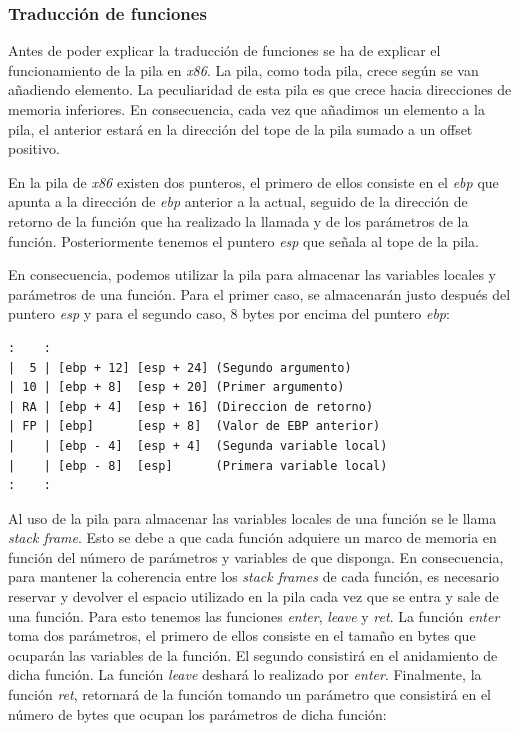 \documentclass[a4paper,10pt]{article}
\begin{document}
\subsubsection{Traducción de funciones}

Antes de poder explicar la traducción de funciones se ha de explicar el funcionamiento de la pila en \textit{x86}. La pila, como toda pila, crece según se van añadiendo elemento. La peculiaridad de esta pila es que crece hacia direcciones de memoria inferiores. En consecuencia, cada vez que añadimos un elemento a la pila, el anterior estará en la dirección del tope de la pila sumado a un offset positivo.

En la pila de \textit{x86} existen dos punteros, el primero de ellos consiste en el \textit{ebp} que apunta a la dirección de \textit{ebp} anterior a la actual, seguido de la dirección de retorno de la función que ha realizado la llamada y de los parámetros de la función. Posteriormente tenemos el puntero \textit{esp} que señala al tope de la pila. 

En consecuencia, podemos utilizar la pila para almacenar las variables locales y parámetros de una función. Para el primer caso, se almacenarán justo después del puntero \textit{esp} y para el segundo caso, 8 bytes por encima del puntero \textit{ebp}:

\begin{lstlisting}
:    : 
|  5 | [ebp + 12] [esp + 24] (Segundo argumento)
| 10 | [ebp + 8]  [esp + 20] (Primer argumento)
| RA | [ebp + 4]  [esp + 16] (Direccion de retorno)
| FP | [ebp]      [esp + 8]  (Valor de EBP anterior)
|    | [ebp - 4]  [esp + 4]  (Segunda variable local)
|    | [ebp - 8]  [esp]      (Primera variable local)
:    :
\end{lstlisting}

Al uso de la pila para almacenar las variables locales de una función se le llama \emph{stack frame}. Esto se debe a que cada función adquiere un marco de memoria en función del número de parámetros y variables de que disponga. En consecuencia, para mantener la coherencia entre los \emph{stack frames} de cada función, es necesario reservar y devolver el espacio utilizado en la pila cada vez que se entra y sale de una función. Para esto tenemos las funciones \textit{enter}, \textit{leave} y \textit{ret}. La función \textit{enter} toma dos parámetros, el primero de ellos consiste en el tamaño en bytes que ocuparán las variables de la función. El segundo consistirá en el anidamiento de dicha función. La función \textit{leave} deshará lo realizado por \textit{enter}. Finalmente, la función \textit{ret}, retornará de la función tomando un parámetro que consistirá en el número de bytes que ocupan los parámetros de dicha función:
\end{document}
